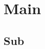\documentclass[a4paper,11pt]{article}
\def\maintitle#1{\section*{#1}}
\def\subtitle#1{\section{#1}}
\begin{document}
\else %
    \ifx\chaptitle\undefined %
        \def\maintitle#1{\subsection{#1}}
        \def\subtitle#1{\subsubsection{#1}}
    \else %
        \def\maintitle#1{\section{#1}}
        \def\subtitle#1{\subsection{#1}}
    \fi
\fi

\maintitle{Main}
\subtitle{Sub}

\ifx\SubfileName\undefined %
     
\end{document}
